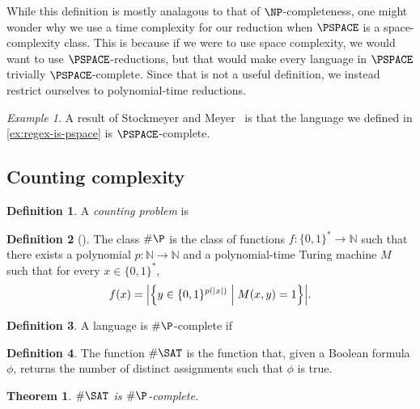 \documentclass[english]{reedthesis}
\theoremstyle{plain}
\newtheorem{thm}{Theorem}[section]
\theoremstyle{definition}
\newtheorem{defn}[defn]{Definition}
\theoremstyle{remark}
\newtheorem{example}{Example}[thm]
\DeclarePairedDelimiter{\abs}{\lvert}{\rvert}
\newcommand{\middlemid}{%
  \ensuremath{\;\middle\vert\;}
}
\begin{document}
While this definition is mostly analagous to that of $\NP$-completeness, one
might wonder why we use a time complexity for our reduction when $\PSPACE$ is a
space-complexity class. This is because if we were to use space complexity, we
would want to use $\PSPACE$-reductions, but that would make every language in
$\PSPACE$ trivially $\PSPACE$-complete. Since that is not a useful definition,
we instead restrict ourselves to polynomial-time reductions.

\begin{example}
  A result of Stockmeyer and Meyer~\cite{SM73} is that the language we defined
  in \cref{ex:regex-is-pspace} is $\PSPACE$-complete.
\end{example}

\subsection{Counting complexity}

\begin{defn}\label{def:counting-problem}
  A \emph{counting problem} is %
\end{defn}

\begin{defn}[{\cite[Def.\ 9.2]{AB09}}]\label{def:hash-p}
  The class $\#\P$ is the class of functions $f: \{0, 1\}^{*} \rightarrow \mathbb{N}$ such that
  there exists a polynomial $p: \mathbb{N} \rightarrow \mathbb{N}$ and a polynomial-time Turing machine $M$
  such that for every $x \in \{0, 1\}^{*}$,
  \begin{equation}
    f(x) = \abs*{\mleft\{y \in \{0, 1\}^{p(\abs{x})} \middlemid M(x, y) = 1\mright\}}.
  \end{equation}
\end{defn}

\begin{defn}\label{def:hash-p-complete}
  A language is $\#\P$-complete if %
\end{defn}

\begin{defn}\label{def:hash-sat}
  The function $\#\SAT$ is the function that, given a Boolean formula $\phi$,
  returns the number of distinct assignments such that $\phi$ is true.
\end{defn}

\begin{thm}\label{thm-hash-sat-is-complete}
  $\#\SAT$ is $\#\P$-complete.
\end{thm}
\end{document}
